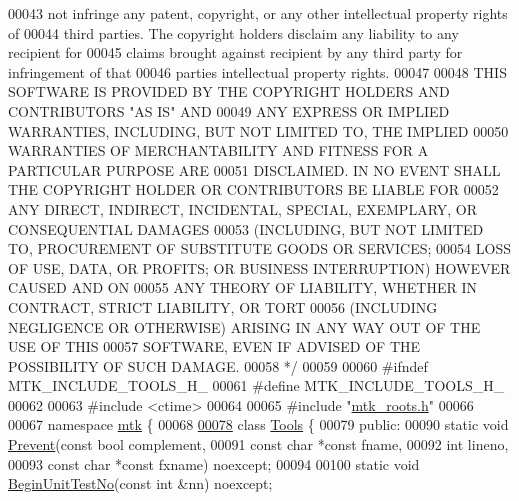 \begin{DoxyCode}
00043 \textcolor{comment}{not infringe any patent, copyright, or any other intellectual property rights of}
00044 \textcolor{comment}{third parties. The copyright holders disclaim any liability to any recipient for}
00045 \textcolor{comment}{claims brought against recipient by any third party for infringement of that}
00046 \textcolor{comment}{parties intellectual property rights.}
00047 \textcolor{comment}{}
00048 \textcolor{comment}{THIS SOFTWARE IS PROVIDED BY THE COPYRIGHT HOLDERS AND CONTRIBUTORS "AS IS" AND}
00049 \textcolor{comment}{ANY EXPRESS OR IMPLIED WARRANTIES, INCLUDING, BUT NOT LIMITED TO, THE IMPLIED}
00050 \textcolor{comment}{WARRANTIES OF MERCHANTABILITY AND FITNESS FOR A PARTICULAR PURPOSE ARE}
00051 \textcolor{comment}{DISCLAIMED. IN NO EVENT SHALL THE COPYRIGHT HOLDER OR CONTRIBUTORS BE LIABLE FOR}
00052 \textcolor{comment}{ANY DIRECT, INDIRECT, INCIDENTAL, SPECIAL, EXEMPLARY, OR CONSEQUENTIAL DAMAGES}
00053 \textcolor{comment}{(INCLUDING, BUT NOT LIMITED TO, PROCUREMENT OF SUBSTITUTE GOODS OR SERVICES;}
00054 \textcolor{comment}{LOSS OF USE, DATA, OR PROFITS; OR BUSINESS INTERRUPTION) HOWEVER CAUSED AND ON}
00055 \textcolor{comment}{ANY THEORY OF LIABILITY, WHETHER IN CONTRACT, STRICT LIABILITY, OR TORT}
00056 \textcolor{comment}{(INCLUDING NEGLIGENCE OR OTHERWISE) ARISING IN ANY WAY OUT OF THE USE OF THIS}
00057 \textcolor{comment}{SOFTWARE, EVEN IF ADVISED OF THE POSSIBILITY OF SUCH DAMAGE.}
00058 \textcolor{comment}{*/}
00059 
00060 \textcolor{preprocessor}{#ifndef MTK\_INCLUDE\_TOOLS\_H\_}
00061 \textcolor{preprocessor}{#define MTK\_INCLUDE\_TOOLS\_H\_}
00062 
00063 \textcolor{preprocessor}{#include <ctime>}
00064 
00065 \textcolor{preprocessor}{#include "\hyperlink{mtk__roots_8h}{mtk\_roots.h}"}
00066 
00067 \textcolor{keyword}{namespace }\hyperlink{namespacemtk}{mtk} \{
00068 
\hypertarget{mtk__tools_8h_source_l00078}{}\hyperlink{classmtk_1_1Tools}{00078} \textcolor{keyword}{class }\hyperlink{classmtk_1_1Tools}{Tools} \{
00079  \textcolor{keyword}{public}:
00090   \textcolor{keyword}{static} \textcolor{keywordtype}{void} \hyperlink{classmtk_1_1Tools_a332324c6f25e66be9dff48c5987a3b9f}{Prevent}(\textcolor{keyword}{const} \textcolor{keywordtype}{bool} complement,
00091                       \textcolor{keyword}{const} \textcolor{keywordtype}{char} *\textcolor{keyword}{const} fname,
00092                       \textcolor{keywordtype}{int} lineno,
00093                       \textcolor{keyword}{const} \textcolor{keywordtype}{char} *\textcolor{keyword}{const} fxname) noexcept;
00094 
00100   \textcolor{keyword}{static} \textcolor{keywordtype}{void} \hyperlink{classmtk_1_1Tools_afc29ecaf337a13ed2e817d3890a5a441}{BeginUnitTestNo}(\textcolor{keyword}{const} \textcolor{keywordtype}{int} &nn) noexcept;

\end{DoxyCode}
